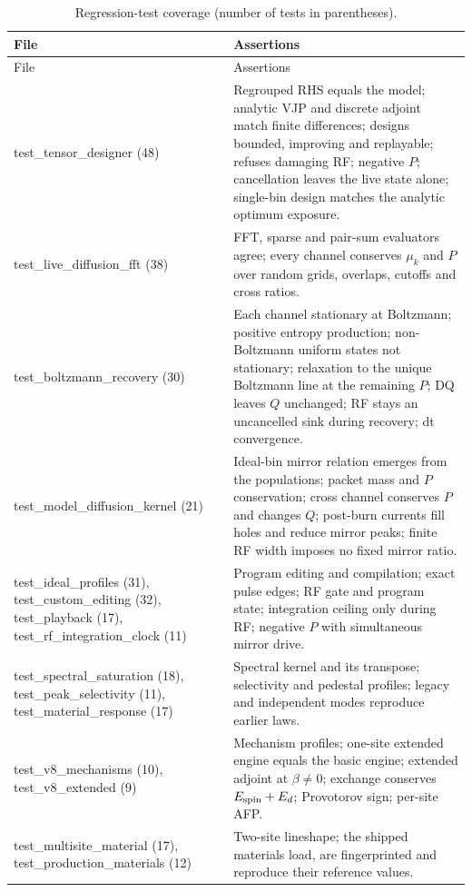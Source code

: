 \documentclass[11pt]{article}
\begin{document}
\begin{longtable}{L{0.36\textwidth} L{0.58\textwidth}}
\caption{Regression-test coverage (number of tests in parentheses).}\label{tab:tests}\\
\toprule
File & Assertions\\
\midrule
\endfirsthead
\toprule
File & Assertions\\
\midrule
\endhead
test\_tensor\_designer (48) & Regrouped RHS equals the model; analytic VJP and discrete adjoint match finite differences; designs bounded, improving and replayable; refuses damaging RF; negative \(P\); cancellation leaves the live state alone; single-bin design matches the analytic optimum exposure.\\
test\_live\_diffusion\_fft (38) & FFT, sparse and pair-sum evaluators agree; every channel conserves \(\mu_k\) and \(P\) over random grids, overlaps, cutoffs and cross ratios.\\
test\_boltzmann\_recovery (30) & Each channel stationary at Boltzmann; positive entropy production; non-Boltzmann uniform states not stationary; relaxation to the unique Boltzmann line at the remaining \(P\); DQ leaves \(Q\) unchanged; RF stays an uncancelled sink during recovery; dt convergence.\\
test\_model\_diffusion\_kernel (21) & Ideal-bin mirror relation emerges from the populations; packet mass and \(P\) conservation; cross channel conserves \(P\) and changes \(Q\); post-burn currents fill holes and reduce mirror peaks; finite RF width imposes no fixed mirror ratio.\\
test\_ideal\_profiles (31), test\_custom\_editing (32), test\_playback (17), test\_rf\_integration\_clock (11) & Program editing and compilation; exact pulse edges; RF gate and program state; integration ceiling only during RF; negative \(P\) with simultaneous mirror drive.\\
test\_spectral\_saturation (18), test\_peak\_selectivity (11), test\_material\_response (17) & Spectral kernel and its transpose; selectivity and pedestal profiles; legacy and independent modes reproduce earlier laws.\\
test\_v8\_mechanisms (10), test\_v8\_extended (9) & Mechanism profiles; one-site extended engine equals the basic engine; extended adjoint at \(\beta\ne0\); exchange conserves \(E_{\rm spin}+E_d\); Provotorov sign; per-site AFP.\\
test\_multisite\_material (17), test\_production\_materials (12) & Two-site lineshape; the shipped materials load, are fingerprinted and reproduce their reference values.\\

\end{longtable}
\end{document}
